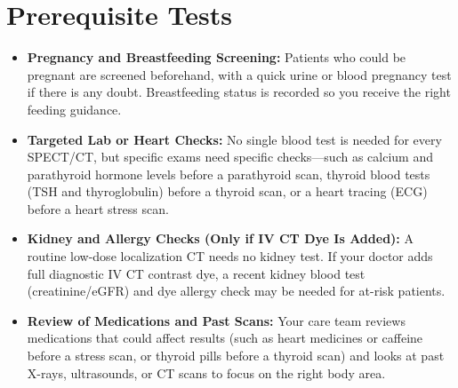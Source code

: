\section{Prerequisite Tests}
\begin{itemize}
    \item \textbf{Pregnancy and Breastfeeding Screening:} Patients who could be pregnant are screened beforehand, with a quick urine or blood pregnancy test if there is any doubt. Breastfeeding status is recorded so you receive the right feeding guidance.
    \item \textbf{Targeted Lab or Heart Checks:} No single blood test is needed for every SPECT/CT, but specific exams need specific checks---such as calcium and parathyroid hormone levels before a parathyroid scan, thyroid blood tests (TSH and thyroglobulin) before a thyroid scan, or a heart tracing (ECG) before a heart stress scan.
    \item \textbf{Kidney and Allergy Checks (Only if IV CT Dye Is Added):} A routine low-dose localization CT needs no kidney test. If your doctor adds full diagnostic IV CT contrast dye, a recent kidney blood test (creatinine/eGFR) and dye allergy check may be needed for at-risk patients.
    \item \textbf{Review of Medications and Past Scans:} Your care team reviews medications that could affect results (such as heart medicines or caffeine before a stress scan, or thyroid pills before a thyroid scan) and looks at past X-rays, ultrasounds, or CT scans to focus on the right body area.
\end{itemize}

